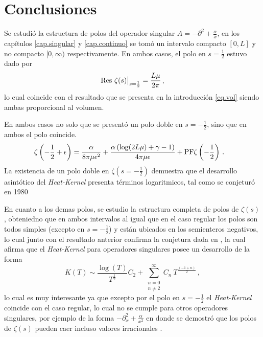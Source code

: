 \chapter{Conclusiones}

Se estudió la estructura de polos del operador singular $A = - \partial ^2 + \frac{\alpha}{x} $, 
en los capítulos \ref{cap.singular} y \ref{cap.continuo} se tomó un intervalo compacto $[0,L]$ y no compacto $[0, \infty)$ respectivamente.
En ambos casos, el polo en $s = \frac{1}{2}$ estuvo dado por
\begin{equation}
{\rm Res } \ \zeta (s) \big|_{s = \frac{1}{2}}
= \frac{L \mu}{2 \pi}
\, ,
\end{equation}
lo cual coincide con el resultado que se presenta en la introducción \eqref{eq.vol} siendo ambas proporcional al volumen.


En ambos casos no solo que se presentó un polo doble en $s= -\frac{1}{2}$, sino que en ambos el polo coincide.
\begin{align*}
&
	\zeta \left( - \frac{1}{2} + \epsilon \right) = 
	\frac{\alpha}{8 \pi \mu  \epsilon  ^2} +
	\frac{\alpha \left( \log (2 L \mu ) + \gamma -1  \right)}{4 \pi \mu  \epsilon } +
	{\rm PF } \zeta \left( - \frac{1}{2} \right)
\, .
\end{align*}
La existencia de un polo doble en $\zeta \left(s = - \frac{1}{2} \right)$ demuestra que el desarrollo asintótico del {\it Heat-Kernel} presenta términos logaritmicos, tal como se conjeturó en 1980 \cite{Callias1980}


En cuanto a los demas polos, se estudio la estructura completa de polos de $\zeta \left(s \right)$, obteniedno que en ambos intervalos al igual que en el caso regular los polos son todos simples (excepto en $s= - \frac{1}{2}$) y están ubicados en los semienteros negativos, lo cual junto con el resultado anterior confirma la conjetura dada en \cite{Callias1980}, la cual afirma que el {\it Heat-Kernel} para operadores singulares posee un desarrollo de la forma  
\begin{equation}
	K(T) \sim 
	\frac{ \log (T)}{T ^{\frac{1}{2} }} C _{2} +
	\sum _{\substack{n=0 \\ n \neq 2}} ^{\infty}
	C _n  \ 
	T^{\frac{(-1+n)}{2}} 
\, ,
\end{equation}
lo cual es muy interesante ya que excepto por el polo en $s = - \frac{1}{2}$ el {\it Heat-Kernel} coincide con el caso regular, lo cual no se cumple para otros operadores singulares, por ejemplo de la forma $- \partial ^2 _x + \frac{\alpha}{x ^2}$ en donde se demostró que los polos de $\zeta (s)$ pueden caer incluso valores irracionales \cite{doi:10.1063/1.1809257}.



